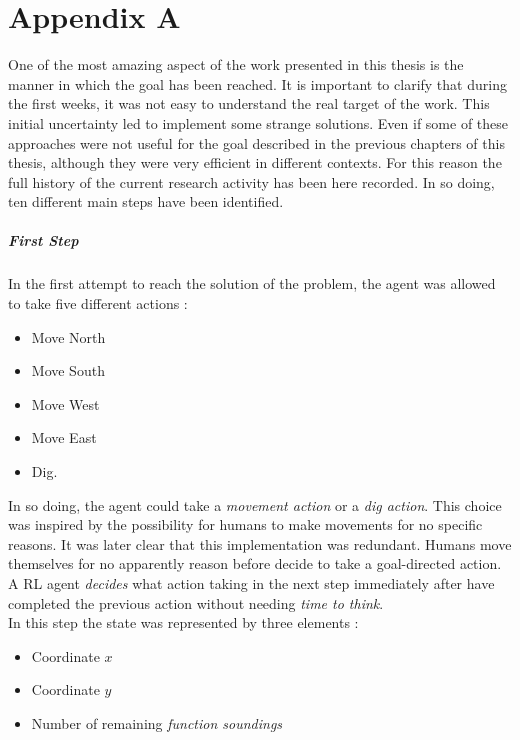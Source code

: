 \chapter{Appendix A}

One of the most amazing aspect of the work presented in this thesis is the manner in which the goal has been reached. It is important to clarify that during the first weeks, it was not easy to understand the real target of the work. This initial uncertainty led to implement some strange solutions. Even if some of these approaches were not useful for the goal described in the previous chapters of this thesis, although they were very efficient in different contexts. For this reason the full history of the current research activity has been here recorded. In so doing, ten different main steps have been identified. 

\paragraph{First Step} In the first attempt to reach the solution of the problem, the agent was allowed to take five different actions :

\begin{itemize}
	\item Move North
	\item Move South
	\item Move West
	\item Move East
	\item Dig.
\end{itemize}

In so doing, the agent could take a \textit{movement action} or a \textit{dig action}. This choice was inspired by the possibility for humans to make movements for no specific reasons. It was later clear that this implementation was redundant. Humans move themselves for no apparently reason before decide to take a goal-directed action. A RL agent \textit{decides} what action taking in the next step immediately after have completed the previous action without needing \textit{time to think}. \\

In this step the state was represented by three elements :

\begin{itemize}
	\item Coordinate $x$
	\item Coordinate $y$
	\item Number of remaining \textit{function soundings}
\end{itemize}

